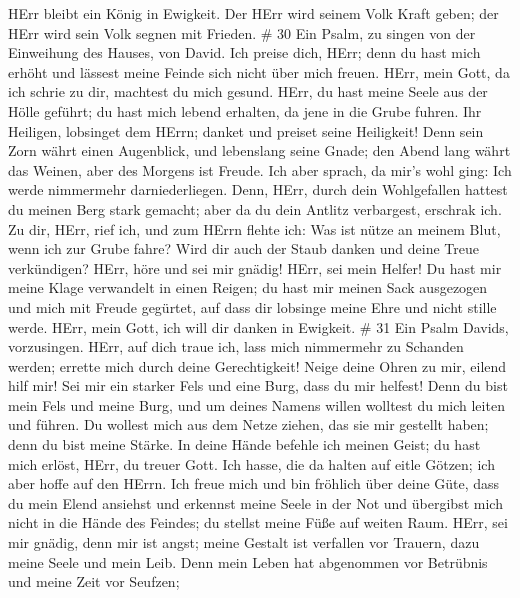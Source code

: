 HErr bleibt ein König in Ewigkeit.  Der HErr wird seinem
Volk Kraft geben; der HErr wird sein Volk segnen mit Frieden. \# 30
 Ein Psalm, zu singen von der Einweihung des Hauses, von
David.  Ich preise dich, HErr; denn du hast mich erhöht und
lässest meine Feinde sich nicht über mich freuen.  HErr,
mein Gott, da ich schrie zu dir, machtest du mich gesund. 
HErr, du hast meine Seele aus der Hölle geführt; du hast mich lebend
erhalten, da jene in die Grube fuhren.  Ihr Heiligen,
lobsinget dem HErrn; danket und preiset seine Heiligkeit! 
Denn sein Zorn währt einen Augenblick, und lebenslang seine Gnade; den
Abend lang währt das Weinen, aber des Morgens ist Freude. 
Ich aber sprach, da mir's wohl ging: Ich werde nimmermehr
darniederliegen.  Denn, HErr, durch dein Wohlgefallen
hattest du meinen Berg stark gemacht; aber da du dein Antlitz
verbargest, erschrak ich.  Zu dir, HErr, rief ich, und zum
HErrn flehte ich:  Was ist nütze an meinem Blut, wenn ich
zur Grube fahre? Wird dir auch der Staub danken und deine Treue
verkündigen?  HErr, höre und sei mir gnädig! HErr, sei mein
Helfer!  Du hast mir meine Klage verwandelt in einen
Reigen; du hast mir meinen Sack ausgezogen und mich mit Freude gegürtet,
 auf dass dir lobsinge meine Ehre und nicht stille werde.
HErr, mein Gott, ich will dir danken in Ewigkeit. \# 31  Ein
Psalm Davids, vorzusingen.  HErr, auf dich traue ich, lass
mich nimmermehr zu Schanden werden; errette mich durch deine
Gerechtigkeit!  Neige deine Ohren zu mir, eilend hilf mir!
Sei mir ein starker Fels und eine Burg, dass du mir helfest!
 Denn du bist mein Fels und meine Burg, und um deines Namens
willen wolltest du mich leiten und führen.  Du wollest mich
aus dem Netze ziehen, das sie mir gestellt haben; denn du bist meine
Stärke.  In deine Hände befehle ich meinen Geist; du hast
mich erlöst, HErr, du treuer Gott.  Ich hasse, die da halten
auf eitle Götzen; ich aber hoffe auf den HErrn.  Ich freue
mich und bin fröhlich über deine Güte, dass du mein Elend ansiehst und
erkennst meine Seele in der Not  und übergibst mich nicht in
die Hände des Feindes; du stellst meine Füße auf weiten Raum.
 HErr, sei mir gnädig, denn mir ist angst; meine Gestalt
ist verfallen vor Trauern, dazu meine Seele und mein Leib. 
Denn mein Leben hat abgenommen vor Betrübnis und meine Zeit vor Seufzen;

